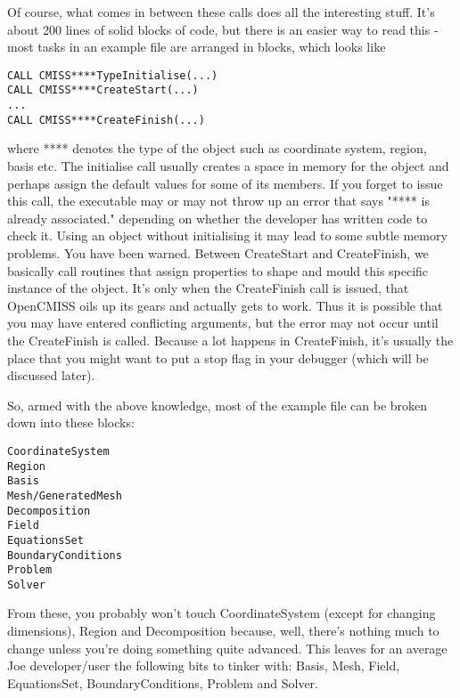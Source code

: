 Of course, what comes in between these calls does all the interesting stuff. It's about 200 
lines of solid blocks of code, but there is an easier way to read this - most tasks in an
example file are arranged in blocks, which looks like
\begin{lstlisting}
CALL CMISS****TypeInitialise(...)
CALL CMISS****CreateStart(...)
...
CALL CMISS****CreateFinish(...)
\end{lstlisting}
where **** denotes the type of the object such as coordinate system, region, basis etc. 
The initialise call usually creates a space in memory for the object and perhaps assign the
default values for some of its members. If you forget to issue this call, the executable may
or may not throw up an error that says "**** is already associated." depending on whether the 
developer has written code to check it. Using an object without initialising it may lead to 
some subtle memory problems. You have been warned.
Between CreateStart and CreateFinish, we basically call routines that assign properties to 
shape and mould this specific instance of the object. It's only when the CreateFinish call 
is issued, that OpenCMISS oils up its gears and actually gets to work. Thus it is possible that
you may have entered conflicting arguments, but the error may not occur until the CreateFinish
is called. Because a lot happens in CreateFinish, it's usually the place that you might want
to put a stop flag in your debugger (which will be discussed later).

So, armed with the above knowledge, most of the example file can be broken down into these 
blocks:
\begin{lstlisting}
CoordinateSystem
Region
Basis
Mesh/GeneratedMesh
Decomposition
Field
EquationsSet
BoundaryConditions
Problem
Solver
\end{lstlisting}
From these, you probably won't touch CoordinateSystem (except for changing dimensions), Region 
and Decomposition because, well, there's nothing much to change unless you're doing something
quite advanced. This leaves for an average Joe developer/user the following bits to tinker with:
Basis, Mesh, Field, EquationsSet, BoundaryConditions, Problem and Solver.

